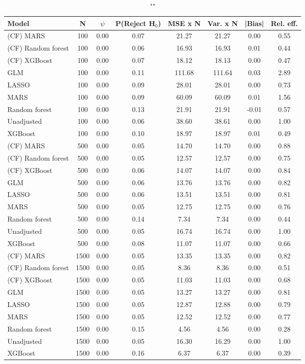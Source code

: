 \begin{table}
\centering
\caption{""}
\begin{tabular}{lccccccc}
\toprule
Model & N & $\psi$ & P(Reject H$_0$) & MSE x N & Var. x N & |Bias| & Rel. eff.\\ \midrule
(CF) MARS & 100 & 0.00 & 0.07 &  21.27 &  21.27 &  0.00 & 0.55 \\ 
(CF) Random forest & 100 & 0.00 & 0.06 &  16.93 &  16.93 &  0.01 & 0.44 \\ 
(CF) XGBoost & 100 & 0.00 & 0.07 &  18.12 &  18.13 &  0.00 & 0.47 \\ 
GLM & 100 & 0.00 & 0.11 & 111.68 & 111.64 &  0.03 & 2.89 \\ 
LASSO & 100 & 0.00 & 0.09 &  28.01 &  28.01 &  0.00 & 0.73 \\ 
MARS & 100 & 0.00 & 0.09 &  60.09 &  60.09 &  0.01 & 1.56 \\ 
Random forest & 100 & 0.00 & 0.13 &  21.91 &  21.91 & -0.01 & 0.57 \\ 
Unadjusted & 100 & 0.00 & 0.06 &  38.60 &  38.61 &  0.00 & 1.00 \\ 
XGBoost & 100 & 0.00 & 0.10 &  18.97 &  18.97 &  0.01 & 0.49 \\ \addlinespace 
(CF) MARS & 500 & 0.00 & 0.05 &  14.70 &  14.70 &  0.00 & 0.88 \\ 
(CF) Random forest & 500 & 0.00 & 0.05 &  12.57 &  12.57 &  0.00 & 0.75 \\ 
(CF) XGBoost & 500 & 0.00 & 0.06 &  14.07 &  14.07 &  0.00 & 0.84 \\ 
GLM & 500 & 0.00 & 0.06 &  13.76 &  13.76 &  0.00 & 0.82 \\ 
LASSO & 500 & 0.00 & 0.06 &  13.51 &  13.51 &  0.00 & 0.81 \\ 
MARS & 500 & 0.00 & 0.05 &  12.75 &  12.75 &  0.00 & 0.76 \\ 
Random forest & 500 & 0.00 & 0.14 &   7.34 &   7.34 &  0.00 & 0.44 \\ 
Unadjusted & 500 & 0.00 & 0.05 &  16.74 &  16.74 &  0.00 & 1.00 \\ 
XGBoost & 500 & 0.00 & 0.08 &  11.07 &  11.07 &  0.00 & 0.66 \\ \addlinespace 
(CF) MARS & 1500 & 0.00 & 0.05 &  13.35 &  13.35 &  0.00 & 0.82 \\ 
(CF) Random forest & 1500 & 0.00 & 0.05 &   8.36 &   8.36 &  0.00 & 0.51 \\ 
(CF) XGBoost & 1500 & 0.00 & 0.05 &  11.03 &  11.03 &  0.00 & 0.68 \\ 
GLM & 1500 & 0.00 & 0.05 &  13.27 &  13.27 &  0.00 & 0.81 \\ 
LASSO & 1500 & 0.00 & 0.05 &  12.87 &  12.88 &  0.00 & 0.79 \\ 
MARS & 1500 & 0.00 & 0.05 &  12.52 &  12.52 &  0.00 & 0.77 \\ 
Random forest & 1500 & 0.00 & 0.15 &   4.56 &   4.56 &  0.00 & 0.28 \\ 
Unadjusted & 1500 & 0.00 & 0.05 &  16.30 &  16.29 &  0.00 & 1.00 \\ 
XGBoost & 1500 & 0.00 & 0.16 &   6.37 &   6.37 &  0.00 & 0.39 \\
\bottomrule
\end{tabular}
\end{table}

